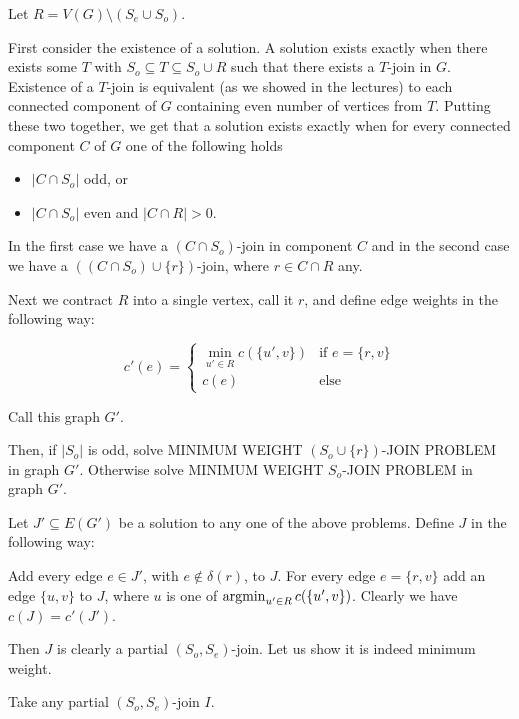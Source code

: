 \begin{exercise}{3}
    Let $R = V(G) \setminus (S_e \cup S_o)$.

    First consider the existence of a solution. A solution exists exactly when
    there exists some $T$ with $S_o \subseteq T \subseteq S_o \cup R$ such that
    there exists a $T$-join in $G$. Existence of a $T$-join is equivalent (as we
    showed in the lectures) to each connected component of $G$ containing even
    number of vertices from $T$. Putting these two together, we get that a
    solution exists exactly when for every connected component $C$ of $G$ one of
    the following holds
    \begin{itemize}
        \item{$|C \cap S_o|$ odd, or}
        \item{$|C \cap S_o|$ even and $|C \cap R| > 0$.}
    \end{itemize}
    In the first case we have a $(C \cap S_o)$-join in component $C$ and in the
    second case we have a $((C \cap S_o) \cup \{r\})$-join, where $r \in C \cap
    R$ any.

    Next we contract $R$ into a single vertex, call it $r$, and define edge weights in the
    following way:

    \begin{equation*}
        c'(e) = \begin{cases}
            \min_{u' \in R} c(\{u', v\})  & \text{if $e = \{r, v\}$} \\
            c(e) & \text{else}
        \end{cases}
    \end{equation*}

    Call this graph $G'$.

    Then, if $|S_o|$ is odd, solve MINIMUM WEIGHT $(S_o \cup \{r\})$-JOIN
    PROBLEM in graph $G'$. Otherwise solve MINIMUM WEIGHT $S_o$-JOIN PROBLEM in
    graph $G'$.

    Let $J' \subseteq E(G')$ be a solution to any one of the above problems.
    Define $J$ in the following way:

    Add every edge $e \in J'$, with $e \notin \delta(r)$, to $J$. For every edge
    $e = \{r, v\}$ add an edge $\{u, v\}$ to $J$, where $u$ is one of
    $\operatorname{argmin}_{u' \in R} c(\{u', v\})$. Clearly we have $c(J) = c'(J')$.

    Then $J$ is clearly a partial $(S_o, S_e)$-join. Let us show it is indeed
    minimum weight.

    Take any partial $(S_o, S_e)$-join $I$.


\end{exercise}
